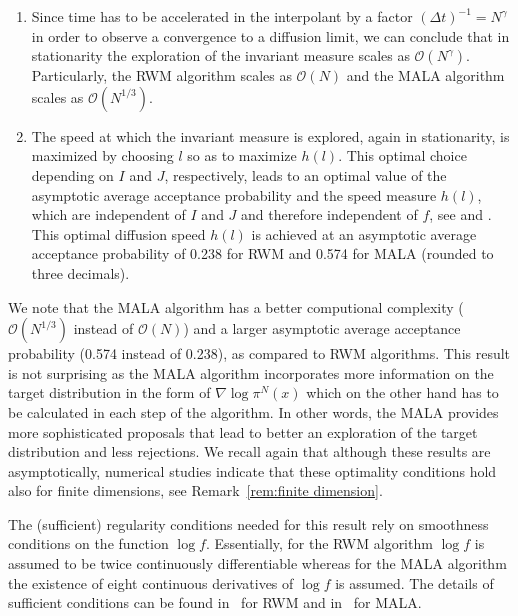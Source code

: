 \begin{enumerate}
 \item Since time has to be accelerated in the interpolant by a factor $ \left( \Delta t \right)^{-1} = N^{\gamma}$ in order to observe a convergence to a diffusion limit, we can conclude that in stationarity the exploration of the invariant measure scales as $ \mathcal{O}(N^{\gamma}) $. Particularly, the RWM algorithm scales as $ \mathcal{O}(N) $ and the MALA algorithm scales as $ \mathcal{O}(N^{1/3}) $.
 \item The speed at which the invariant measure is explored, again in stationarity, is maximized by choosing $l$ so as to maximize $h(l)$. This optimal choice depending on $I$ and $J$, respectively, leads to an optimal value of the asymptotic average acceptance probability and the speed measure $h(l)$, which are independent of $I$ and $J$ and therefore independent of $f$, see \autocite{Roberts1997} and \autocite{Roberts1998}. This optimal diffusion speed $h(l)$ is achieved at an asymptotic average acceptance probability of 0.238 for  RWM and 0.574 for MALA (rounded to three decimals).
\end{enumerate}

We note that the MALA algorithm has a better computional complexity ($ \mathcal{O}(N^{1/3}) $ instead of $ \mathcal{O}(N) $) and a larger asymptotic average acceptance probability (0.574 instead of 0.238), as compared to RWM algorithms. This result is not surprising as the MALA algorithm incorporates more information on the target distribution in the form of $ \nabla \log \pi^{N}(x) $ which on the other hand has to be calculated in each step of the algorithm. In other words, the MALA provides more sophisticated proposals that lead to better an exploration of the target distribution and less rejections. We recall again that although these results are asymptotically, numerical studies indicate that these optimality conditions hold also for finite dimensions, see Remark~\ref{rem:finite dimension}.

\begin{rem}
\label{rem:Conditions on f}
 The (sufficient) regularity conditions needed for this result rely on smoothness conditions on the function $\log f$. Essentially, for the RWM algorithm $\log f$ is assumed to be twice continuously differentiable whereas for the MALA algorithm the existence of eight continuous derivatives of $\log f$ is assumed. The details of sufficient conditions can be found in~\autocite{Roberts1997} for RWM and in~\autocite{Roberts1998} for MALA.
\end{rem}





